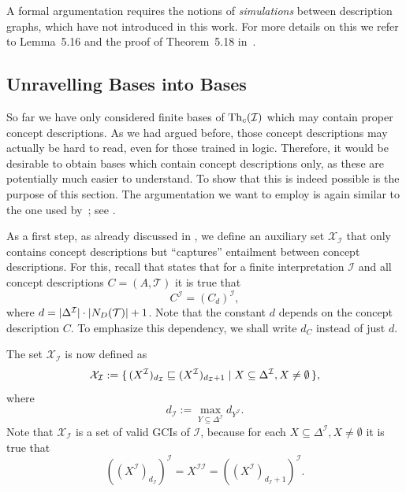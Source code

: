 A formal argumentation requires the notions of \emph{simulations} between \EL description
graphs, which have not introduced in this work.  For more details on this we refer to
Lemma~5.16 and the proof of Theorem~5.18 in~\cite{Diss-Felix}.

\subsection{Unravelling \ELgfpbot Bases into \ELbot Bases}
\label{sec:unrav-elgfpb-bases}

So far we have only considered finite bases of $\operatorname{Th}_c(\mathcal{I})$ which may contain
proper \ELgfpbot concept descriptions.  As we had argued before, those concept
descriptions may actually be hard to read, even for those trained in logic.  Therefore, it
would be desirable to obtain bases which contain \ELbot concept descriptions only, as
these are potentially much easier to understand.  To show that this is indeed possible is
the purpose of this section.  The argumentation we want to employ is again similar to the
one used by~\cite{Diss-Felix}; see .

As a first step, as already discussed in , we define an auxiliary
set $\mathcal{X}_{\mathcal{I}}$ that only contains \ELbot concept descriptions but
``captures'' entailment between \ELgfpbot concept descriptions.  For this, recall that
 states that for a finite interpretation $\mathcal{I}$ and all
\ELgfpbot concept descriptions $C = (A, \mathcal{T})$ it is true that
\begin{equation*}
  C^{\mathcal{I}} = (C_d)^{\mathcal{I}},
\end{equation*}
where $d = \lvert \Delta^{\mathcal{I}} \rvert \cdot \lvert N_D(\mathcal{T}) \rvert + 1$.  Note that
the constant $d$ depends on the concept description $C$.  To emphasize this dependency, we
shall write $d_{C}$ instead of just $d$.

The set $\mathcal{X}_{\mathcal{I}}$ is now defined as
\begin{equation*}
  \mathcal{X}_{\mathcal{I}} := {\{\, (X^{\mathcal{I}})_{d_{\mathcal{I}}} \sqsubseteq
    (X^{\mathcal{I}})_{d_{\mathcal{I}}+1} \mid X \subseteq \Delta^{\mathcal{I}}, X \neq
    \emptyset \,\}},  
\end{equation*}
where
\begin{equation*}
  d_{\mathcal{I}} := \max_{Y \subseteq \Delta^{\mathcal{I}}} d_{Y^{\mathcal{I}}}.
\end{equation*}
Note that $\mathcal{X}_{\mathcal{I}}$ is a set of valid GCIs of $\mathcal{I}$, because
for each $X \subseteq \Delta^{\mathcal{I}}, X \neq \emptyset$ it is true that
\begin{equation*}
  ((X^{\mathcal{I}})_{d_{\mathcal{I}}})^{\mathcal{I}} = X^{\mathcal{I}\mathcal{I}} =
  ((X^{\mathcal{I}})_{d_{\mathcal{I}}+1})^{\mathcal{I}}.
\end{equation*}

